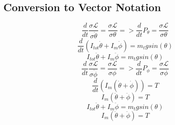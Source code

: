 \documentclass[12pt]{article}
\begin{document}
		\subsection{Conversion to Vector Notation}
			\begin{equation}
				\frac{d}{dt}\frac{\sigma\mathcal{L}}{\sigma\dot\theta} = \frac{\sigma\mathcal{L}}{\sigma\theta} => \frac{d}{dt}P_\theta = \frac{\sigma\mathcal{L}}{\sigma\theta}
			\end{equation}
			\begin{equation}
				\frac{d}{dt}(I_{tot}\dot\theta + I_m\dot\phi) = m_tgsin(\theta)
			\end{equation}
			\begin{equation}
				I_{tot}\ddot\theta + I_m\ddot\phi = m_tgsin(\theta)
			\end{equation}
			\begin{equation}
				\frac{d}{dt}\frac{\sigma\mathcal{L}}{\sigma\dot\phi} = \frac{\sigma\mathcal{L}}{\sigma\phi} => \frac{d}{dt}P_\phi = \frac{\sigma\mathcal{L}}{\sigma\phi}
			\end{equation}
			\begin{equation}
				\frac{d}{dt}(I_m(\dot\theta + \dot\phi)) = T
			\end{equation}
			\begin{equation}
				I_m(\ddot\theta + \ddot\phi) = T
			\end{equation}
			\begin{equation}
				\boxed{I_{tot}\ddot\theta + I_m\ddot\phi = m_tgsin(\theta)}
			\end{equation}
			\begin{equation}
				\boxed{I_m(\ddot\theta + \ddot\phi) = T}
			\end{equation}
	
\end{document}
